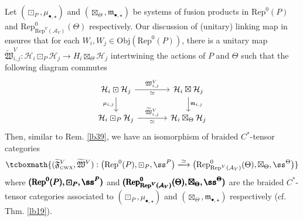 \documentclass[11pt,b5paper,notitlepage]{article}
\theoremstyle{definition}
\theoremstyle{plain}
\newcommand{\fk}{\mathfrak}
\newcommand{\mc}{\mathcal}
\newcommand{\wtd}{\widetilde}
\newcommand{\Rep}{\mathrm{Rep}}
\newcommand{\blt}{\bullet}
\newcommand{\Obj}{\mathrm{Obj}}
\newcommand{\mk}{\mathfrak m}
\newcommand{\tFVCWX}{{\widetilde{\mathfrak F}^V_{\scriptscriptstyle \mathrm{CWX}}}}
\numberwithin{equation}{section}
\begin{document}
Let $(\boxdot_P,\mu_{\blt,\star})$ and $(\boxtimes_\Theta,\mk_{\blt,\star})$ be systems of fusion products in $\Rep^0(P)$ and $\Rep^0_{\Rep^V(\mc A_V)}(\Theta)$ respectively. Our discussion of (unitary) linking map in ensures that for each $W_i,W_j\in\Obj(\Rep^0(P))$, there is a unitary map $\wtd{\fk W}^V_{i,j}:\mc H_i\boxdot_P\mc H_j\rightarrow H_i\boxtimes_\Theta\mc H_j$ intertwining the actions of $P$ and $\Theta$ such that the following diagram commutes
\begin{equation}\label{eq85}
\begin{tikzcd}[column sep=large]
\mc H_i\boxdot\mc H_j\arrow[r,"\fk W^V_{i,j}","\simeq"']\arrow[d,"\mu_{i,j}"'] & \mc H_i\boxtimes\mc H_j\arrow[d,"\mk_{i,j}"]\\
\mc H_i\boxdot_P\mc H_j\arrow[r,"\wtd{\fk W}^V_{i,j}","\simeq"']& \mc H_i\boxtimes_\Theta\mc H_j
\end{tikzcd}
\end{equation}
Then, similar to Rem. \ref{lb39}, we have an isomorphism of braided $C^*$-tensor categories
\begin{align}\label{eq73}
\tcboxmath{(\tFVCWX,\wtd{\fk W}^V):\big(\Rep^0(P),\boxdot_P,\ss^P\big)\xlongrightarrow{\simeq}\big(\Rep_{\Rep^V(\mc A_V)}^0(\Theta),\boxtimes_\Theta,\ss^\Theta\big)}
\end{align}
where $\pmb{(\Rep^0(P),\boxdot_P,\ss^P)}$ and $\pmb{(\Rep_{\Rep^V(\mc A_V)}^0(\Theta),\boxtimes_\Theta,\ss^\Theta)}$ are the braided $C^*$-tensor categories associated to $(\boxdot_P,\mu_{\blt,\star})$ and $(\boxtimes_\Theta,\mk_{\blt,\star})$ respectively (cf. Thm. \ref{lb19}).
\end{document}
